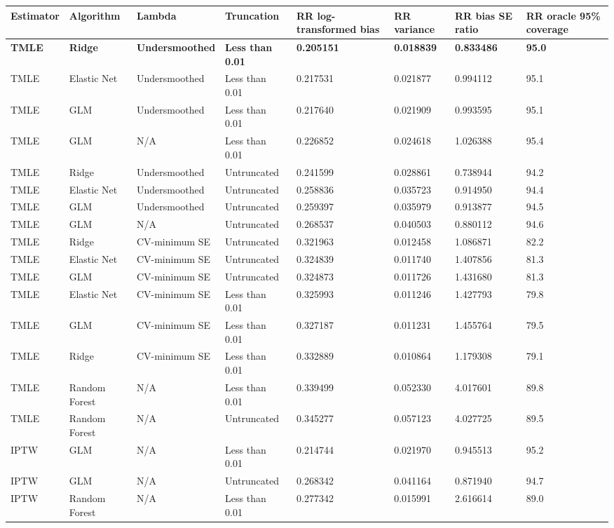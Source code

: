 
\begin{longtable}[l]{llllllll}
\toprule
Estimator & Algorithm & Lambda & Truncation & RR log-transformed bias & RR variance & RR bias SE ratio & RR oracle 95\% coverage\\
\midrule
\midrule
\textbf{TMLE} & \textbf{Ridge} & \textbf{Undersmoothed} & \textbf{Less than 0.01} & \textbf{0.205151} & \textbf{0.018839} & \textbf{0.833486} & \textbf{95.0}\\
\midrule
TMLE & Elastic Net & Undersmoothed & Less than 0.01 & 0.217531 & 0.021877 & 0.994112 & 95.1\\
TMLE & GLM & Undersmoothed & Less than 0.01 & 0.217640 & 0.021909 & 0.993595 & 95.1\\
TMLE & GLM & N/A & Less than 0.01 & 0.226852 & 0.024618 & 1.026388 & 95.4\\
TMLE & Ridge & Undersmoothed & Untruncated & 0.241599 & 0.028861 & 0.738944 & 94.2\\
TMLE & Elastic Net & Undersmoothed & Untruncated & 0.258836 & 0.035723 & 0.914950 & 94.4\\
TMLE & GLM & Undersmoothed & Untruncated & 0.259397 & 0.035979 & 0.913877 & 94.5\\
TMLE & GLM & N/A & Untruncated & 0.268537 & 0.040503 & 0.880112 & 94.6\\
TMLE & Ridge & CV-minimum SE & Untruncated & 0.321963 & 0.012458 & 1.086871 & 82.2\\
TMLE & Elastic Net & CV-minimum SE & Untruncated & 0.324839 & 0.011740 & 1.407856 & 81.3\\
TMLE & GLM & CV-minimum SE & Untruncated & 0.324873 & 0.011726 & 1.431680 & 81.3\\
TMLE & Elastic Net & CV-minimum SE & Less than 0.01 & 0.325993 & 0.011246 & 1.427793 & 79.8\\
TMLE & GLM & CV-minimum SE & Less than 0.01 & 0.327187 & 0.011231 & 1.455764 & 79.5\\
TMLE & Ridge & CV-minimum SE & Less than 0.01 & 0.332889 & 0.010864 & 1.179308 & 79.1\\
TMLE & Random Forest & N/A & Less than 0.01 & 0.339499 & 0.052330 & 4.017601 & 89.8\\
TMLE & Random Forest & N/A & Untruncated & 0.345277 & 0.057123 & 4.027725 & 89.5\\
IPTW & GLM & N/A & Less than 0.01 & 0.214744 & 0.021970 & 0.945513 & 95.2\\
IPTW & GLM & N/A & Untruncated & 0.268342 & 0.041164 & 0.871940 & 94.7\\
IPTW & Random Forest & N/A & Less than 0.01 & 0.277342 & 0.015991 & 2.616614 & 89.0\\

\end{longtable}
